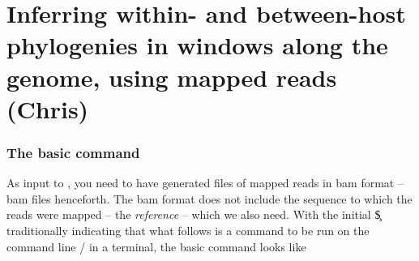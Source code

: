\part{Inferring within- and between-host phylogenies in windows along the genome, using mapped reads (Chris)}

\section{The basic command}

As input to \p, you need to have generated files of mapped reads in bam format -- bam files henceforth.
The bam format does not include the sequence to which the reads were mapped -- the {\it reference} -- which we also need.
With the initial \c{\$} traditionally indicating that what follows is a command to be run on the command line / in a terminal, the basic \p command looks like

